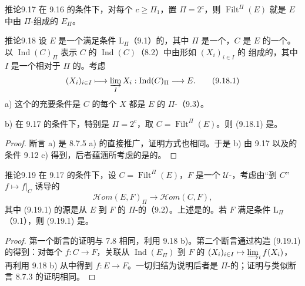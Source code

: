 \begin{SGAresult}{推论}{9.17}
在 9.16 的条件下，对每个 $c\geq\Pi_1$，置 $\Pi=2^c$，则 $\operatorname{Filt}^\Pi(E)$ 就是 $E$ 中由 $\Pi$-组成的 $E_\Pi$。
\end{SGAresult}

\begin{SGAresult}{推论}{9.18}
设 $E$ 是一个满足条件 $\mathrm L_\Pi$（9.1）的，其中 $\Pi$ 是一个，$C$ 是 $E$ 的一个。以 $\operatorname{Ind}(C)_\Pi$ 表示 $C$ 的  $\operatorname{Ind}(C)$（8.2）中由形如 $(X_i)_{i\in I}$ 的 组成的，其中 $I$ 是一个相对于 $\Pi$  的。考虑
\[
(X_i)_{i\in I}\longmapsto\varinjlim_I X_i:
\operatorname{Ind}(C)_\Pi\longrightarrow E.\tag{9.18.1}
\]
a) 这个的充要条件是 $C$ 的每个 $X$ 都是 $E$ 的 $\Pi$-（9.3）。

b) 在 9.17 的条件下，特别是 $\Pi=2^c$，取 $C=\operatorname{Filt}^\Pi(E)$。则 (9.18.1) 是。
\end{SGAresult}
\begin{proof}
断言 a) 是 8.7.5 a) 的直接推广，证明方式也相同。于是 b) 由 9.17 以及的条件 9.12 c) 得到，后者蕴涵所考虑的是的。
\end{proof}

\begin{SGAresult}{推论}{9.19}
在 9.17 的条件下，设 $C=\operatorname{Filt}^\Pi(E)$，$F$ 是一个 $\mathcal U$-，考虑由“到 $C$” $f\mapsto f|_C$ 诱导的
\[
\mathscr{H}om(E,F)_\Pi\longrightarrow\mathscr{H}om(C,F),\tag{9.19.1}
\]
其中 (9.19.1) 的源是从 $E$ 到 $F$ 的 $\Pi$-的（9.2）。上述是的。若 $F$ 满足条件 $\mathrm L_\Pi$（9.1），则 (9.19.1) 是。
\end{SGAresult}
\begin{proof}
第一个断言的证明与 7.8 相同，利用 9.18 b)。第二个断言通过构造 (9.19.1) 的得到：对每个 $f:C\to F$，关联从 $\operatorname{Ind}(E_\Pi)$ 到 $F$ 的 $(X_i)_{i\in I}\mapsto\varinjlim_i f(X_i)$，
再利用 9.18 b) 从中得到 $f:E\to F$。一切归结为说明后者是 $\Pi$-的；证明与类似断言 8.7.3 的证明相同。
\end{proof}

